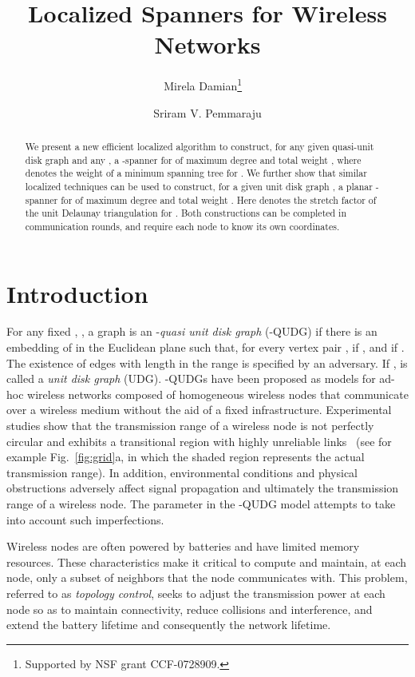 \documentclass{llncs}
\title{\vspace{-2em}Localized Spanners for Wireless Networks}
\author{Mirela Damian\thanks{Supported by NSF grant CCF-0728909.}
\inst{1}\ \and Sriram V. Pemmaraju\inst{2}}
\institute{Dept. Comput. Sci., Villanova Univ., Villanova, PA
19085, USA. \email{mirela.damian@villanova.edu}.
\and
Dept. Comput. Sci., Univ. of Iowa, Iowa City, IA
52246, USA. \email{sriram@cs.uiowa.edu}.
}
\date{}
\begin{document}
\maketitle

\begin{abstract}
We present a new efficient localized algorithm to construct, for any
given quasi-unit disk graph  and any ,
a -spanner for  of maximum
degree  and total weight , where 
denotes the weight of a minimum spanning tree for . We further
show that similar localized techniques can be used to construct, for a given unit disk
graph , a planar -spanner
for  of maximum degree  and total weight . Here 
denotes the stretch factor of the unit Delaunay triangulation for .
Both constructions can be completed in  communication rounds,
and require each node to know its own coordinates.
\end{abstract}

\section{Introduction}
For any fixed , , a graph  is an
-\emph{quasi unit disk graph} (-QUDG) if there is an
embedding of  in the Euclidean plane such that, for every vertex
pair ,  if , and  if . The existence of edges with length in the
range  is specified by an adversary. If , 
is called a \emph{unit disk graph} (UDG). -QUDGs
have been proposed as models for ad-hoc wireless networks
composed of homogeneous wireless nodes that communicate over a wireless medium without the aid of a fixed
infrastructure. Experimental studies show that the transmission range of a wireless
node is not perfectly circular and exhibits a transitional region
with highly unreliable links~\cite{ZK-qudg-07} (see for example
Fig.~\ref{fig:grid}a, in which the shaded region represents the
actual transmission range). In addition,
environmental conditions and physical obstructions adversely affect
signal propagation and ultimately the transmission range of a
wireless node. The parameter  in the -QUDG model
attempts to take into account such imperfections.

Wireless nodes are often powered by batteries and have limited
memory resources. These characteristics make it critical to
compute and maintain, at each node, only a subset of neighbors
that the node communicates with. This problem, referred to as
\emph{topology control}, seeks to adjust the transmission power
at each node so as to maintain connectivity, reduce
collisions and interference, and extend the battery lifetime
and consequently the network lifetime.
\end{document}
